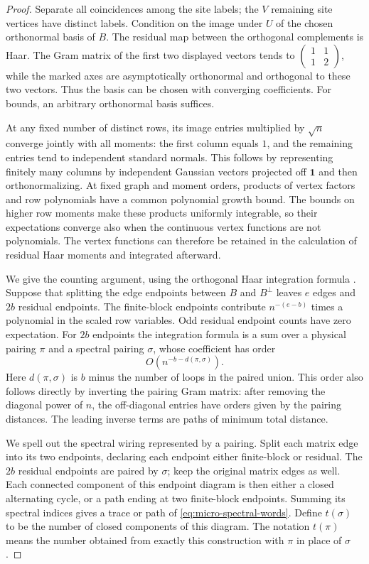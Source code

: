 \begin{proof}
Separate all coincidences among the site labels; the $V$ remaining site
vertices have distinct labels. Condition on the image under $U$ of the
chosen orthonormal basis of $B$.
The residual map between the orthogonal complements is Haar. The Gram
matrix of the first two displayed vectors tends to
$\left(\begin{smallmatrix}1&1\\1&2\end{smallmatrix}\right)$, while the
marked axes are asymptotically orthonormal and orthogonal to these two
vectors. Thus the basis can be chosen with converging coefficients.
For bounds, an arbitrary orthonormal basis suffices.

At any fixed number of distinct rows, its image entries multiplied by
$\sqrt n$ converge jointly with all moments: the first column equals $1$,
and the remaining entries tend to independent standard normals.
This follows by representing finitely many columns by independent Gaussian
vectors projected off $\mathbf1$ and then orthonormalizing.
At fixed graph and moment orders, products of vertex factors and row
polynomials have a common polynomial growth bound. The bounds on higher
row moments make these products uniformly integrable, so their expectations
converge also when the continuous vertex functions are not polynomials.
The vertex functions can therefore be retained in the calculation of
residual Haar moments and integrated afterward.

We give the counting argument, using the orthogonal Haar integration
formula \cite[Section~3.2]{CollinsSniady2006}. Suppose that splitting the
edge endpoints between $B$ and $B^\perp$ leaves $e$ edges and $2b$ residual
endpoints. The finite-block endpoints contribute $n^{-(e-b)}$ times a
polynomial in the scaled row variables. Odd residual endpoint counts
have zero expectation. For $2b$ endpoints the integration formula is a
sum over a physical pairing $\pi$ and a spectral pairing $\sigma$, whose
coefficient has order
\[
 O(n^{-b-d(\pi,\sigma)}).
\]
Here $d(\pi,\sigma)$ is $b$ minus the number of loops in the paired union.
This order also follows directly by inverting the pairing Gram matrix:
after removing the diagonal power of $n$, the off-diagonal entries have
orders given by the pairing distances. The leading inverse terms are
paths of minimum total distance.

We spell out the spectral wiring represented by a pairing. Split each
matrix edge into its two endpoints, declaring each endpoint either
finite-block or residual. The $2b$ residual endpoints are paired by
$\sigma$; keep the original matrix edges as well. Each connected
component of this endpoint diagram is then either a closed alternating
cycle, or a path ending at two finite-block endpoints. Summing its
spectral indices gives a trace or path of
\eqref{eq:micro-spectral-words}. Define $t(\sigma)$ to be the number of
closed components of this diagram. The notation $t(\pi)$ means the
number obtained from exactly this construction with $\pi$ in place of
$\sigma$.


\end{proof}
